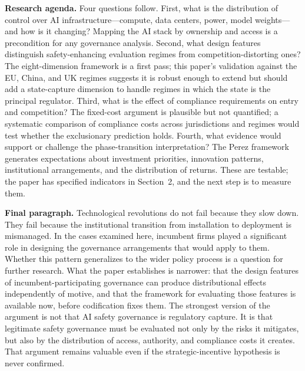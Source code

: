 \textbf{Research agenda.} Four questions follow. First, what is the distribution of control over AI infrastructure---compute, data centers, power, model weights---and how is it changing? Mapping the AI stack by ownership and access is a precondition for any governance analysis. Second, what design features distinguish safety-enhancing evaluation regimes from competition-distorting ones? The eight-dimension framework is a first pass; this paper's validation against the EU, China, and UK regimes suggests it is robust enough to extend but should add a state-capture dimension to handle regimes in which the state is the principal regulator. Third, what is the effect of compliance requirements on entry and competition? The fixed-cost argument is plausible but not quantified; a systematic comparison of compliance costs across jurisdictions and regimes would test whether the exclusionary prediction holds. Fourth, what evidence would support or challenge the phase-transition interpretation? The Perez framework generates expectations about investment priorities, innovation patterns, institutional arrangements, and the distribution of returns. These are testable; the paper has specified indicators in Section~2, and the next step is to measure them.

\textbf{Final paragraph.} Technological revolutions do not fail because they slow down. They fail because the institutional transition from installation to deployment is mismanaged. In the cases examined here, incumbent firms played a significant role in designing the governance arrangements that would apply to them. Whether this pattern generalizes to the wider policy process is a question for further research. What the paper establishes is narrower: that the design features of incumbent-participating governance can produce distributional effects independently of motive, and that the framework for evaluating those features is available now, before codification fixes them. The strongest version of the argument is not that AI safety governance is regulatory capture. It is that legitimate safety governance must be evaluated not only by the risks it mitigates, but also by the distribution of access, authority, and compliance costs it creates. That argument remains valuable even if the strategic-incentive hypothesis is never confirmed.
